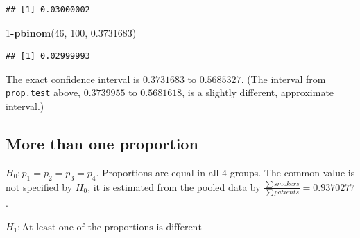 \documentclass[
]{book}
\newenvironment{Shaded}{\begin{snugshade}}{\end{snugshade}}
\newcommand{\DecValTok}[1]{\textcolor[rgb]{0.00,0.00,0.81}{#1}}
\newcommand{\FloatTok}[1]{\textcolor[rgb]{0.00,0.00,0.81}{#1}}
\newcommand{\FunctionTok}[1]{\textcolor[rgb]{0.13,0.29,0.53}{\textbf{#1}}}
\newcommand{\NormalTok}[1]{#1}
\newcommand{\SpecialCharTok}[1]{\textcolor[rgb]{0.81,0.36,0.00}{\textbf{#1}}}
\begin{document}
\begin{itemize}
\begin{verbatim}
## [1] 0.03000002
\end{verbatim}

\begin{Shaded}
\begin{Highlighting}[]
\DecValTok{1}\SpecialCharTok{{-}}\FunctionTok{pbinom}\NormalTok{(}\DecValTok{46}\NormalTok{, }\DecValTok{100}\NormalTok{, }\FloatTok{0.3731683}\NormalTok{)}
\end{Highlighting}
\end{Shaded}

\begin{verbatim}
## [1] 0.02999993
\end{verbatim}

  The exact confidence interval is \(0.3731683\) to \(0.5685327\).
  (The interval from \texttt{prop.test} above, \(0.3739955\) to \(0.5681618\), is a slightly different, approximate interval.)
\end{itemize}

\subsection{More than one proportion}\label{proportions_test_more_samples}

\(H_0: p_1 = p_2 = p_3 = p_4\). Proportions are equal in all 4 groups. The common value is not specified by \(H_0\),
it is estimated from the pooled data by \(\frac{\sum smokers}{\sum patients} = 0.9370277\).

\(H_1: \text{At least one of the proportions is different}\)
\end{document}
